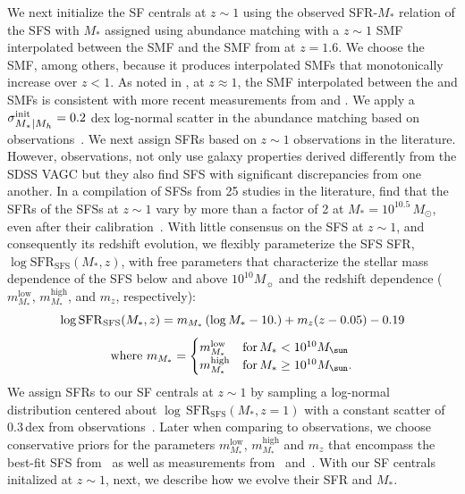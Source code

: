 \documentclass[12pt, letterpaper, preprint, tighten]{aastex62}
\newcommand{\beq}{\begin{equation}}
\newcommand{\eeq}{\end{equation}}
\newcommand{\logsfr}{\log\mathrm{SFR}}
\newcommand{\siglogm}{\sigma_{\scaleto{M_*|M_h}{8pt}}}
\begin{document}
We next initialize the SF centrals at $z\sim1$ using the observed SFR-$M_*$
relation of the SFS with $M_*$ assigned using abundance matching with a $z\sim1$ SMF
interpolated between the \cite{li2009} SMF and the SMF from \cite{marchesini2009}
at $z = 1.6$. We choose the \cite{marchesini2009} SMF, among others, because it
produces interpolated SMFs that monotonically increase over $z < 1$. As noted
in \cite{hahn2017b}, at $z \approx 1$, the SMF interpolated between the
\cite{li2009} and \cite{marchesini2009} SMFs is consistent with more recent
measurements from \cite{muzzin2013} and \cite{ilbert2013}. We apply a
$\siglogm^{\rm init} = 0.2$ dex log-normal scatter in the abundance matching based on 
observations~\citep[\emph{e.g.}][]{leauthaud2012, tinker2013, patel2015}.
We next assign SFRs based on $z \sim 1$ observations in the literature.
However, observations, not only use galaxy properties derived differently
from the SDSS VAGC but they also find SFS with significant discrepancies
from one another. In a compilation of SFSs from 25 studies in the literature, 
\cite{speagle2014} find that the SFRs of the SFSs at $z\sim1$ vary by more 
than a factor of 2 at $M_* = 10^{10.5}\, M_\odot$, even after their 
calibration~\citep[see Figure 2 of][]{speagle2014}. With little consensus 
on the SFS at $z\sim1$, and consequently its redshift evolution, we flexibly parameterize the SFS SFR,
$\log\mathrm{SFR}_\mathrm{SFS}(M_*, z)$,
with free parameters that characterize the stellar mass dependence of the SFS
below and above $10^{10} M_\sun$ and the redshift dependence ($m^\mathrm{low}_{M_*}$, 
$m^\mathrm{high}_{M_*}$, and $m_z$, respectively):
\beq \label{eq:logsfr_ms}
\logsfr_{\rm SFS}(M_*, z) =  m_{M_*}\,(\log M_* - 10.) + m_z (z - 0.05) - 0.19
\eeq
\begin{equation*}
{\rm where}~m_{M_*} = \begin{cases}
m^\mathrm{low}_{M_*} & \text{for}\,M_* < 10^{10}M_\sun \\
m^\mathrm{high}_{M_*} & \text{for}\,M_* \geq 10^{10}M_\sun.
\end{cases}
\end{equation*}
We assign SFRs to our SF centrals at $z\sim1$ by sampling a log-normal
distribution centered about $\log\,\mathrm{SFR}_\mathrm{SFS}(M_*, z=1)$
with a constant scatter of $0.3\,\mathrm{dex}$ from observations~\citep{daddi2007, noeske2007, magdis2012, whitaker2012}.
Later when comparing to observations, we choose conservative priors
for the parameters $m^\mathrm{low}_{M_*}$, $m^\mathrm{high}_{M_*}$ and $m_z$
that encompass the best-fit SFS from~\cite{speagle2014} as well as measurements
from~\cite{moustakas2013} and~\cite{lee2015}. With our SF centrals initalized
at $z \sim 1$, next, we describe how we evolve their SFR and $M_*$.
\end{document}
